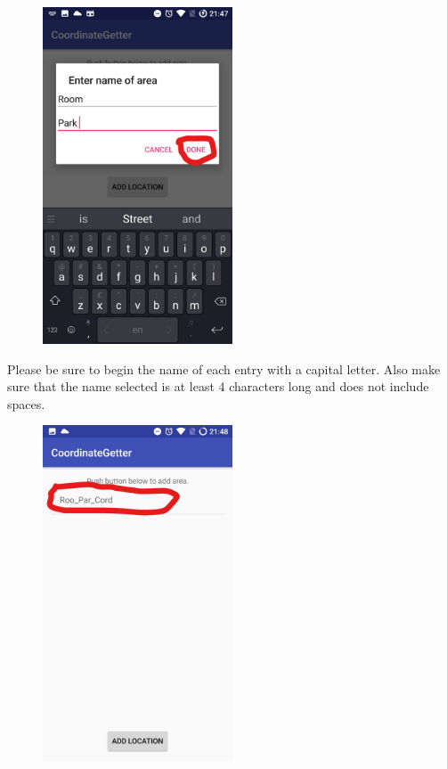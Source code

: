 \documentclass[fontsize=25pt]{scrbook}
\begin{document}
	
	\newpage
	\begin{center}
\begin{figure}
		\includegraphics[height=10cm]{Screenshot_11_LI.jpg}
		
		\end{figure}
	\end{center}
	Please be sure to begin the name of each entry with a capital letter. Also make sure that the name selected is at least 4 characters long and does not include spaces.
	\newpage
	\begin{center}
\begin{figure}
		\includegraphics[height=10cm]{Screenshot_12_LI.jpg}
		
		\end{figure}
	\end{center}
\end{document}
